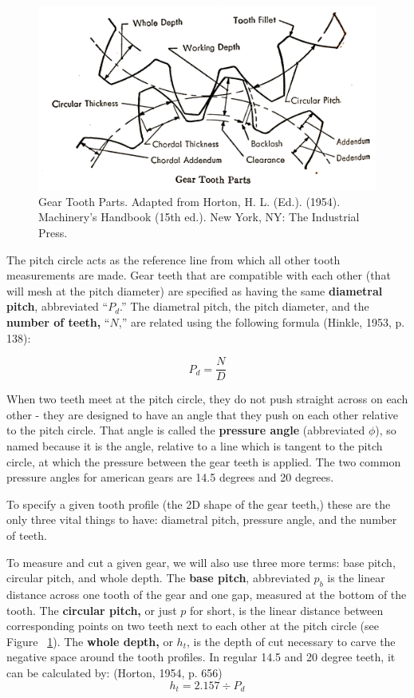 \documentclass[12pt,twoside,letterpaper]{article}
\begin{document}
\begin{figure}[H]
\centering
\includegraphics[width=5in]{gearparts1}
	\caption{Gear Tooth Parts. Adapted from Horton, H. L. (Ed.). (1954). Machinery's Handbook (15th ed.). New York, NY: The Industrial Press. }
	\label{fig:gearToothParts}
\end{figure}

The pitch circle acts as the reference line from which all other tooth measurements are made. Gear teeth that are compatible with each other (that will mesh at the pitch diameter) are specified as having the same \textbf{diametral pitch}, abbreviated ``$P_d$.'' The diametral pitch, the pitch diameter, and the \textbf{number of teeth,} ``$N$,'' are related using the following formula (Hinkle, 1953, p. 138):

\[P_d=\frac{N}{D}\]

When two teeth meet at the pitch circle, they do not push straight across on each other - they are designed to have an angle that they push on each other relative to the pitch circle. That angle is called the \textbf{pressure angle} (abbreviated $\phi$), so named because it is the angle, relative to a line which is tangent to the pitch circle, at which the pressure between the gear teeth is applied. The two common pressure angles for american gears are 14.5 degrees and 20 degrees.

To specify a given tooth profile (the 2D shape of the gear teeth,) these are the only three vital things to have: diametral pitch, pressure angle, and the number of teeth. 

To measure and cut a given gear, we will also use three more terms: base pitch, circular pitch, and whole depth.  The \textbf{base pitch}, abbreviated $p_b$ is the linear distance across one tooth of the gear and one gap, measured at the bottom of the tooth. The \textbf{circular pitch,} or just $p$ for short, is the linear distance between corresponding points on two teeth next to each other at the pitch circle (see Figure ~\ref{fig:gearToothParts}). The \textbf{whole depth,}  or  $h_t$, is the depth of cut necessary to carve the negative space around the tooth profiles. In regular 14.5 and 20 degree teeth, it can be calculated by: (Horton, 1954, p. 656)
 \[ h_t = 2.157 \div P_d \]
\end{document}
